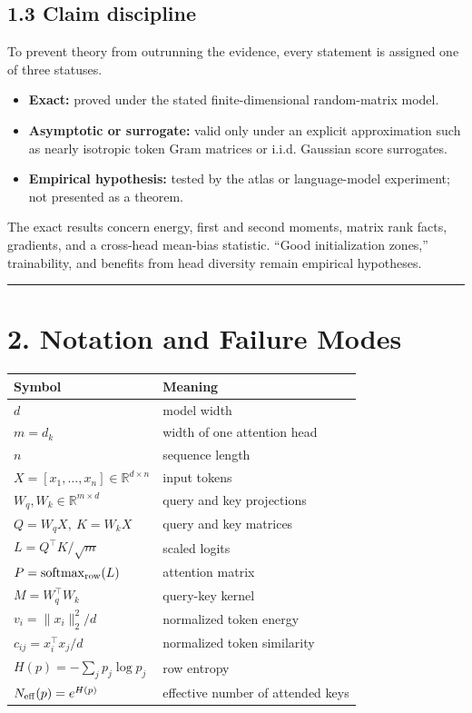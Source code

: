 \documentclass[11pt,letterpaper]{article}
\theoremstyle{definition}
\begin{document}
\subsection{1.3 Claim discipline}
To prevent theory from outrunning the evidence, every statement is assigned one of three statuses.

\begin{itemize}
  \item \textbf{Exact:} proved under the stated finite-dimensional random-matrix model.
  \item \textbf{Asymptotic or surrogate:} valid only under an explicit approximation such as nearly isotropic token Gram matrices or i.i.d. Gaussian score surrogates.
  \item \textbf{Empirical hypothesis:} tested by the atlas or language-model experiment; not presented as a theorem.
\end{itemize}
The exact results concern energy, first and second moments, matrix rank facts, gradients, and a cross-head mean-bias statistic. “Good initialization zones,” trainability, and benefits from head diversity remain empirical hypotheses.

\vspace{0.35em}\hrule\vspace{0.35em}
\section{2. Notation and Failure Modes}
\begin{tabular}{@{}p{}p{}@{}}
\toprule
Symbol & Meaning \\
\midrule
$d$ & model width \\
$m=d_k$ & width of one attention head \\
$n$ & sequence length \\
$X=[x_1,\ldots,x_n]\in\mathbb R^{d\times n}$ & input tokens \\
$W_q,W_k\in\mathbb R^{m\times d}$ & query and key projections \\
$Q=W_qX,\ K=W_kX$ & query and key matrices \\
$L=Q^\top K/\sqrt m$ & scaled logits \\
$P=\operatorname{softmax}_{\rm row}(L)$ & attention matrix \\
$M=W_q^\top W_k$ & query-key kernel \\
$v_i=\|x_i\|_2^2/d$ & normalized token energy \\
$c_{ij}=x_i^\top x_j/d$ & normalized token similarity \\
$H(p)=-\sum_jp_j\log p_j$ & row entropy \\
$N_{\rm eff}(p)=e^{H(p)}$ & effective number of attended keys \\
\bottomrule
\end{tabular}
\end{document}
